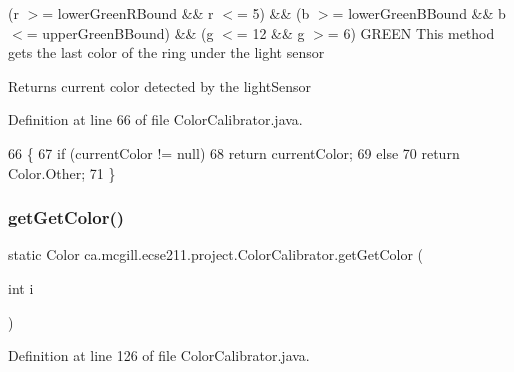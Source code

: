 (r $>$= lower\+Green\+R\+Bound \&\& r $<$= 5) \&\& (b $>$= lower\+Green\+B\+Bound \&\& b $<$= upper\+Green\+B\+Bound) \&\& (g $<$= 12 \&\& g $>$= 6) G\+R\+E\+EN This method gets the last color of the ring under the light sensor

\begin{DoxyReturn}{Returns}
current color detected by the light\+Sensor 
\end{DoxyReturn}


Definition at line 66 of file Color\+Calibrator.\+java.


\begin{DoxyCode}
66                                  \{
67     \textcolor{keywordflow}{if} (currentColor != null)
68       \textcolor{keywordflow}{return} currentColor;
69     \textcolor{keywordflow}{else}
70       \textcolor{keywordflow}{return} Color.Other;
71   \}
\end{DoxyCode}
\mbox{\label{classca_1_1mcgill_1_1ecse211_1_1project_1_1_color_calibrator_acb1d9cef0739971dbe00cc16712be0fe}} 
\subsubsection{\texorpdfstring{get\+Get\+Color()}{getGetColor()}}
{\footnotesize\ttfamily static Color ca.\+mcgill.\+ecse211.\+project.\+Color\+Calibrator.\+get\+Get\+Color (\begin{DoxyParamCaption}\item[{int}]{i }\end{DoxyParamCaption})\hspace{0.3cm}{\ttfamily [static]}}



Definition at line 126 of file Color\+Calibrator.\+java.


